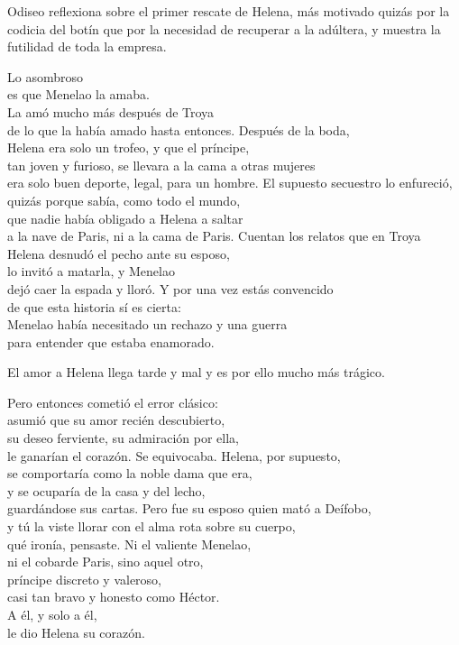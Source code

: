 Odiseo reflexiona sobre el primer rescate de Helena, más motivado quizás por la codicia del botín que por la necesidad de recuperar a la adúltera, y muestra la futilidad de toda la empresa.

\begin{versopropio}
Lo asombroso\\
es que Menelao la amaba.\\
La amó mucho más después de Troya\\
de lo que la había amado hasta entonces.
\stanzabreak
Después de la boda,\\
Helena era solo un trofeo, y que el príncipe,\\
tan joven y furioso, se llevara a la cama a otras mujeres\\
era solo buen deporte, legal, para un hombre.
\stanzabreak
El supuesto secuestro lo enfureció,\\
quizás porque sabía, como todo el mundo,\\
que nadie había obligado a Helena a saltar\\
a la nave de Paris, ni a la cama de Paris.
\stanzabreak
Cuentan los relatos que en Troya\\
Helena desnudó el pecho ante su esposo,\\
lo invitó a matarla, y Menelao\\
dejó caer la espada y lloró.
\stanzabreak
Y por una vez estás convencido\\
de que esta historia sí es cierta:\\
Menelao había necesitado un rechazo y una guerra\\
para entender que estaba enamorado.
\end{versopropio}

El amor a Helena llega tarde y mal y es por ello mucho más trágico.

\begin{versopropio}
Pero entonces cometió el error clásico:\\
asumió que su amor recién descubierto,\\
su deseo ferviente, su admiración por ella,\\
le ganarían el corazón.
\stanzabreak
Se equivocaba. Helena, por supuesto,\\
se comportaría como la noble dama que era,\\
y se ocuparía de la casa y del lecho,\\
guardándose sus cartas.
\stanzabreak
Pero fue su esposo quien mató a Deífobo,\\
y tú la viste llorar con el alma rota sobre su cuerpo,\\
qué ironía, pensaste. Ni el valiente Menelao,\\
ni el cobarde Paris, sino aquel otro,\\
príncipe discreto y valeroso,\\
casi tan bravo y honesto como Héctor.\\
A él, y solo a él,\\
le dio Helena su corazón.
\end{versopropio}

